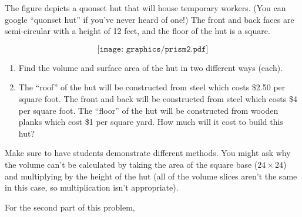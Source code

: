 \documentclass{ximera}
\begin{document}
\begin{problem}
The figure depicts a quonset hut that will house temporary workers.  (You can google ``quonset hut'' if you've never heard of one!)  The front and back faces are semi-circular with a height of 12 feet, and the floor of the hut is a square.

\[
\texttt{[image: graphics/prism2.pdf]}
\]

\begin{enumerate}
    \item Find the volume and surface area of the hut in two different ways (each).
    \item The ``roof'' of the hut will be constructed from steel which costs \$2.50 per square foot. The front and back will be constructed from steel which costs \$4 per square foot.  The ``floor'' of the hut will be constructed from wooden planks which cost \$1 per square yard. How much will it cost to build this hut?
\end{enumerate}

\begin{instructorNotes}
Make sure to have students demonstrate different methods.  You might ask why the volume can't be calculated by taking the area of the square base ($24 \times 24$) and multiplying by the height of the hut (all of the volume slices aren't the same in this case, so multiplication isn't appropriate).  

For the second part of this problem, 
\end{instructorNotes}
\end{problem}
\end{document}
